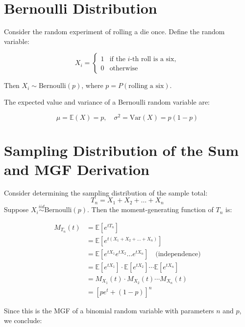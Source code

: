 \section{Bernoulli Distribution}

Consider the random experiment of rolling a die once. Define the random variable:

\[
X_i =
\begin{cases}
1 & \text{if the } i\text{-th roll is a six}, \\
0 & \text{otherwise}
\end{cases}
\]

Then \( X_i \sim \text{Bernoulli}(p) \), where \( p = P(\text{rolling a six}) \). 


The expected value and variance of a Bernoulli random variable are:

\[
\mu = \mathbb{E}(X) = p, \quad \sigma^2 = \mathrm{Var}(X) = p(1 - p)
\]



\section{Sampling Distribution of the Sum and MGF Derivation}

Consider determining the sampling distribution of the sample total:
\[
T_n = X_1 + X_2 + \dots + X_n
\]
Suppose \( X_i \overset{iid}{\sim} \text{Bernoulli}(p) \). Then the moment-generating function of \( T_n \) is:

\begin{align*}
M_{T_n}(t) &= \mathbb{E}[e^{t T_n}] \\
           &= \mathbb{E}\left[e^{t(X_1 + X_2 + \dots + X_n)}\right] \\
           &= \mathbb{E}\left[e^{tX_1} e^{tX_2} \dots e^{tX_n} \right] \quad \text{(independence)} \\
           &= \mathbb{E}[e^{tX_1}] \cdot \mathbb{E}[e^{tX_2}] \cdots \mathbb{E}[e^{tX_n}] \\
           &= M_{X_1}(t) \cdot M_{X_2}(t) \cdots M_{X_n}(t) \\
           &= \left[pe^t + (1 - p)\right]^n
\end{align*}


Since this is the MGF of a binomial random variable with parameters \( n \) and \( p \), we conclude:

